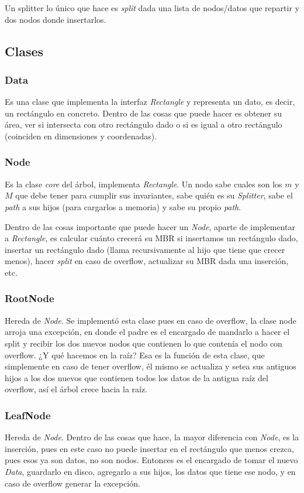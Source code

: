 \documentclass[letterpaper,11pt]{article} %
\begin{document}
			Un splitter lo único que hace es \textit{split} dada una lista de nodos/datos que repartir y dos nodos donde insertarlos.
	
	\subsection{Clases}
		\subsubsection{Data}
			Es una clase que implementa la interfaz \textit{Rectangle} y representa un dato, es decir, un rectángulo en concreto. Dentro de las cosas que puede hacer es obtener su área, ver si intersecta con otro rectángulo dado o si es igual a otro rectángulo (coinciden en dimensiones y coordenadas).
		
		\subsubsection{Node}
			Es la clase \textit{core} del árbol, implementa \textit{Rectangle}. Un nodo sabe cuales son los $m$ y $M$ que debe tener para cumplir sus invariantes, sabe quién es su \textit{Splitter}, sabe el \textit{path} a sus hijos (para cargarlos a memoria) y sabe su propio \textit{path}.
			
			Dentro de las cosas importante que puede hacer un \textit{Node}, aparte de implementar a \textit{Rectangle}, es calcular cuánto crecerá su MBR si insertamos un rectángulo dado, insertar un rectángulo dado (llama recursivamente al hijo que tiene que crecer menos), hacer \textit{split} en caso de overflow, actualizar su MBR dada una inserción, etc.
			
		\subsubsection{RootNode}
			Hereda de \textit{Node}. Se implementó esta clase pues en caso de overflow, la clase node arroja una excepción, en donde el padre es el encargado de mandarlo a hacer el split y recibir los dos nuevos nodos que contienen lo que contenía el nodo con overflow. ¿Y qué hacemos en la raíz? Esa es la función de esta clase, que simplemente en caso de tener overflow, él mismo se actualiza y setea sus antiguos hijos a los dos nuevos que contienen todos los datos de la antigua raíz del overflow, así el árbol crece hacia la raíz.
		
		\subsubsection{LeafNode}
			Hereda de \textit{Node}. Dentro de las cosas que hace, la mayor diferencia con \textit{Node}, es la inserción, pues en este caso no puede insertar en el rectángulo que menos crezca, pues esos ya son datos, no son nodos. Entonces es el encargado de tomar el nuevo \textit{Data}, guardarlo en disco, agregarlo a sus hijos, los datos que tiene ese nodo, y en caso de overflow generar la excepción.
			
\end{document}
